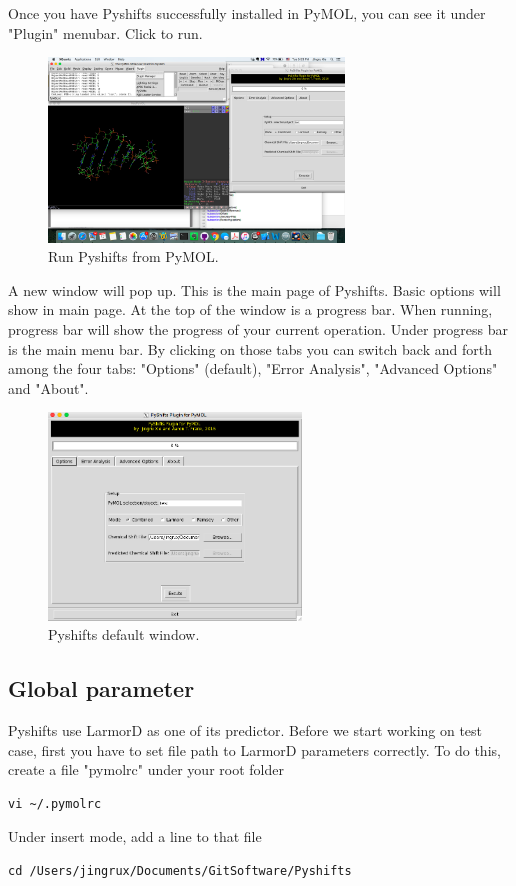 \documentclass{article}
\begin{document}
Once you have Pyshifts successfully installed in PyMOL, you can see it under "Plugin" menubar. Click to run.

\begin{figure}[htbp]
\centering
\includegraphics[width=0.7\textwidth]{layout_0.png}
\caption{Run Pyshifts from PyMOL.}
\label{fig:layout0}
\end{figure}


A new window will pop up. This is the main page of Pyshifts. Basic options will show in main page. At the top of the window is a progress bar. When running, progress bar will show the progress of your current operation. Under progress bar is the main menu bar. By clicking on those tabs you can switch back and forth among the four tabs: "Options" (default), "Error Analysis", "Advanced Options" and "About".

\begin{figure}[htbp]
\centering
\includegraphics[width=0.6\textwidth]{main}
\caption{Pyshifts default window.}
\label{fig:layout1}
\end{figure}



\subsection{Global parameter}
Pyshifts use LarmorD as one of its predictor. Before we start working on test case, first you have to set file path to LarmorD parameters correctly. To do this, create a file "pymolrc" under your root folder
\begin{lstlisting}
vi ~/.pymolrc
\end{lstlisting}
Under insert mode, add a line to that file
\begin{lstlisting}
cd /Users/jingrux/Documents/GitSoftware/Pyshifts
\end{lstlisting}
\end{document}
